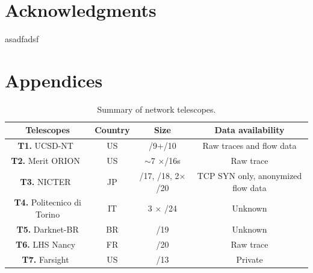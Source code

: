 \documentclass[manuscript,nonacm]{acmart}
\begin{document}
\section{Acknowledgments}
asadfadsf

\section{Appendices}

\begin{table}[httb]
	\small
	\caption{Summary of network telescopes.}\label{tab:telescopes}
	\begin{tabular}{cccc}
		\toprule
		Telescopes & Country & Size & Data availability\\
		\midrule
		\textbf{T1.} UCSD-NT~\cite{caida2025ucsdnt} & US & /9+/10 & Raw traces and flow data \\
		\textbf{T2.} Merit ORION~\cite{orion} & US & $\sim$7 $\times$/16s & Raw trace\\
		\textbf{T3.} NICTER~\cite{nicter2025nt} & JP &  /17, /18, 2$\times$/20 & TCP SYN only, anonymized flow data\\
		\textbf{T4.} Politecnico di Torino \cite{2020soro} & IT & 3 $\times$ /24 & Unknown\\
		\textbf{T5.} Darknet-BR \cite{CunhaCamargo2025darknetbr} & BR & /19 & Unknown\\
		\textbf{T6.} LHS Nancy~\cite{inria2025nt} & FR & /20 & Raw trace\\
		\textbf{T7.} Farsight~\cite{@@} & US & /13 & Private\\
		\bottomrule
	\end{tabular}
\end{table}
\end{document}
